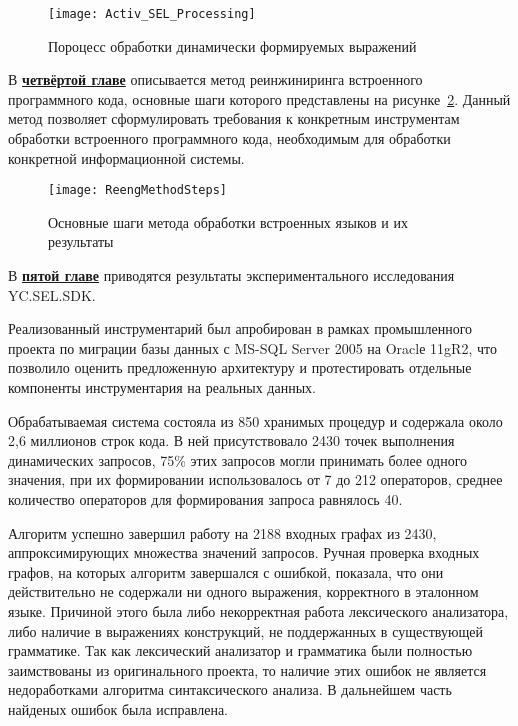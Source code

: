 \begin{figure}[]
  \centering
 \texttt{[image: Activ\_SEL\_Processing]}
 \caption{Пороцесс обработки динамически формируемых выражений}
 \label{sel_processing}
\end{figure}


В \underline{\textbf{четвёртой главе}} описывается метод реинжиниринга встроенного программного кода, основные шаги которого представлены на рисунке~\ref{fig:method}. Данный метод позволяет сформулировать требования к конкретным инструментам обработки встроенного программного кода, необходимым для обработки конкретной информационной системы.

\begin{figure}[]
\begin{center}
\texttt{[image: ReengMethodSteps]}
\caption{Основные шаги метода обработки встроенных языков и их результаты}
\label{fig:method} 
\end{center}
\end{figure}


В \underline{\textbf{пятой главе}} приводятся результаты экспериментального исследования YC.SEL.SDK.

Реализованный инструментарий был апробирован в рамках промышленного проекта по миграции базы данных с MS-SQL Server 2005 на Oraclе 11gR2, что позволило оценить предложенную архитектуру и протестировать отдельные компоненты инструментария на реальных данных.

Обрабатываемая система состояла из 850 хранимых процедур и содержала около 2,6 миллионов строк кода. В ней присутствовало 2430 точек выполнения динамических запросов, 75\% этих запросов могли принимать 
более одного значения, при их формировании использовалось от 7 до 212 операторов, среднее количество операторов для формирования запроса равнялось 40.

Алгоритм успешно завершил работу на 2188 входных графах из 2430, аппроксимирующих множества значений запросов. Ручная проверка входных графов, на которых алгоритм завершался с ошибкой, показала, что они действительно не содержали ни одного выражения, корректного в эталонном языке. Причиной этого была либо некорректная работа лексического анализатора, либо наличие в выражениях конструкций, не поддержанных в существующей грамматике. Так как лексический анализатор и грамматика были полностью заимствованы из оригинального проекта, то наличие этих ошибок не является недоработками алгоритма синтаксического анализа. В дальнейшем часть найденых ошибок была исправлена.

